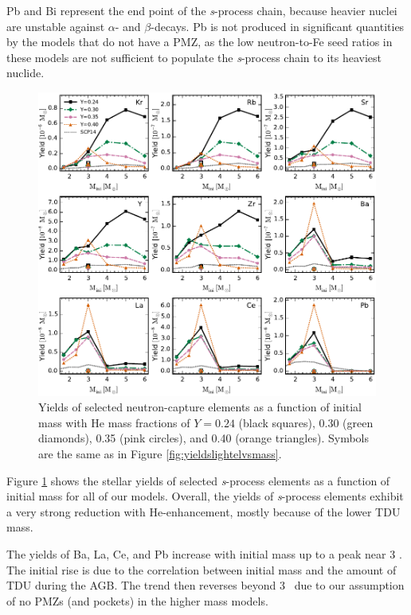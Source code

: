 Pb and Bi represent the end point of the \textit{s}-process chain, because heavier nuclei are unstable against $\alpha$- and $\beta$-decays. Pb is not produced in significant quantities by the models that do not have a PMZ, as the low neutron-to-Fe seed ratios in these models are not sufficient to populate the \textit{s}-process chain to its heaviest nuclide.

\begin{figure}
 \begin{center}\includegraphics[width=\textwidth]{fig-yieldsheavyelvsmass.pdf}\end{center}
 \caption{Yields of selected neutron-capture elements as a function of initial mass with He mass fractions of $Y= 0.24$ (black squares), 0.30 (green diamonds), 0.35 (pink circles), and 0.40 (orange triangles). Symbols are the same as in Figure \ref{fig:yieldslightelvsmass}.}\label{fig:yieldsheavyelvsmass}
\end{figure}

Figure \ref{fig:yieldsheavyelvsmass} shows the stellar yields of selected \textit{s}-process elements as a function of initial mass for all of our models. Overall, the yields of \textit{s}-process elements exhibit a very strong reduction with He-enhancement, mostly because of the lower TDU mass.

The yields of Ba, La, Ce, and Pb increase with initial mass up to a peak near 3 \Msun. The initial rise is due to the correlation between initial mass and the amount of TDU during the AGB. The trend then reverses beyond 3 \Msun\ due to our assumption of no PMZs (and  pockets) in the higher mass models.

